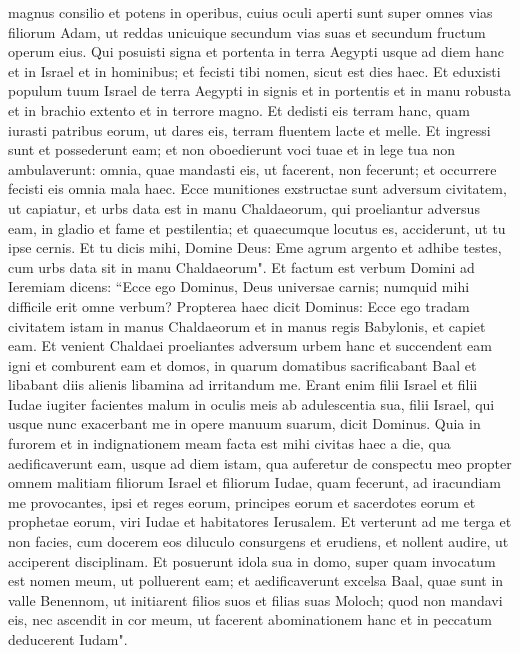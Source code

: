 \begin{biblechapter}
\verse magnus consilio et potens in operibus, cuius oculi aperti sunt super omnes vias filiorum Adam, ut reddas unicuique secundum vias suas et secundum fructum operum eius. 
\verse Qui posuisti signa et portenta in terra Aegypti usque ad diem hanc et in Israel et in hominibus; et fecisti tibi nomen, sicut est dies haec. 
\verse Et eduxisti populum tuum Israel de terra Aegypti in signis et in portentis et in manu robusta et in brachio extento et in terrore magno. 
\verse Et dedisti eis terram hanc, quam iurasti patribus eorum, ut dares eis, terram fluentem lacte et melle. 
\verse Et ingressi sunt et possederunt eam; et non oboedierunt voci tuae et in lege tua non ambulaverunt: omnia, quae mandasti eis, ut facerent, non fecerunt; et occurrere fecisti eis omnia mala haec. 
\verse Ecce munitiones exstructae sunt adversum civitatem, ut capiatur, et urbs data est in manu Chaldaeorum, qui proeliantur adversus eam, in gladio et fame et pestilentia; et quaecumque locutus es, acciderunt, ut tu ipse cernis.  
\verse Et tu dicis mihi, Domine Deus: Eme agrum argento et adhibe testes, cum urbs data sit in manu Chaldaeorum". 
\verse Et factum est verbum Domini ad Ieremiam dicens: 
\verse “Ecce ego Dominus, Deus universae carnis; numquid mihi difficile erit omne verbum? 
\verse Propterea haec dicit Dominus: Ecce ego tradam civitatem istam in manus Chaldaeorum et in manus regis Babylonis, et capiet eam. 
\verse Et venient Chaldaei proeliantes adversum urbem hanc et succendent eam igni et comburent eam et domos, in quarum domatibus sacrificabant Baal et libabant diis alienis libamina ad irritandum me.  
\verse Erant enim filii Israel et filii Iudae iugiter facientes malum in oculis meis ab adulescentia sua, filii Israel, qui usque nunc exacerbant me in opere manuum suarum, dicit Dominus. 
\verse Quia in furorem et in indignationem meam facta est mihi civitas haec a die, qua aedificaverunt eam, usque ad diem istam, qua auferetur de conspectu meo 
\verse propter omnem malitiam filiorum Israel et filiorum Iudae, quam fecerunt, ad iracundiam me provocantes, ipsi et reges eorum, principes eorum et sacerdotes eorum et prophetae eorum, viri Iudae et habitatores Ierusalem. 
\verse Et verterunt ad me terga et non facies, cum docerem eos diluculo consurgens et erudiens, et nollent audire, ut acciperent disciplinam. 
\verse Et posuerunt idola sua in domo, super quam invocatum est nomen meum, ut polluerent eam; 
\verse et aedificaverunt excelsa Baal, quae sunt in valle Benennom, ut initiarent filios suos et filias suas Moloch; quod non mandavi eis, nec ascendit in cor meum, ut facerent abominationem hanc et in peccatum deducerent Iudam". 

\end{biblechapter}
